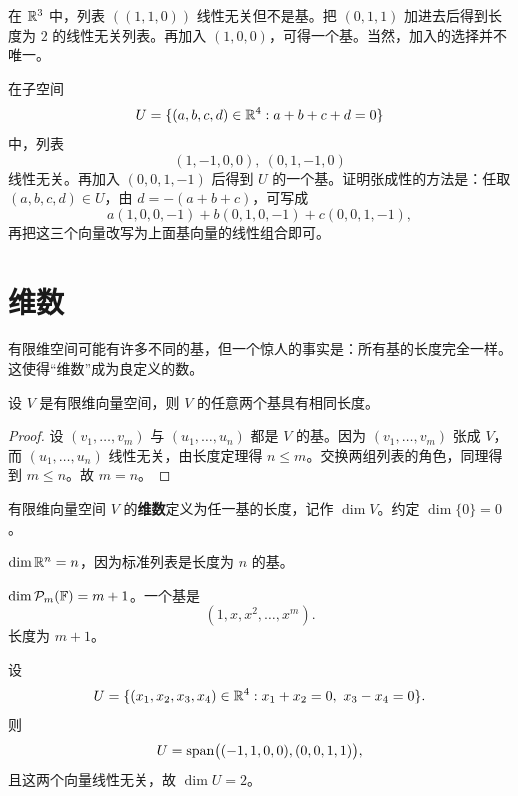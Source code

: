 \begin{example} 在 $\mathbb{R}^3$ 中，列表 $((1,1,0))$ 线性无关但不是基。把 $(0,1,1)$ 加进去后得到长度为 $2$ 的线性无关列表。再加入 $(1,0,0)$，可得一个基。当然，加入的选择并不唯一。
\end{example}

\begin{example} 在子空间
\[ U=\{(a,b,c,d)\in\mathbb{R}^4:a+b+c+d=0\} \]
中，列表
\[ (1,-1,0,0),\ (0,1,-1,0) \]
线性无关。再加入 $(0,0,1,-1)$ 后得到 $U$ 的一个基。证明张成性的方法是：任取 $(a,b,c,d)\in U$，由 $d=-(a+b+c)$，可写成
\[ a(1,0,0,-1)+b(0,1,0,-1)+c(0,0,1,-1), \]
再把这三个向量改写为上面基向量的线性组合即可。
\end{example}

\section{维数}

有限维空间可能有许多不同的基，但一个惊人的事实是：所有基的长度完全一样。这使得“维数”成为良定义的数。

\begin{theorem} 设 $V$ 是有限维向量空间，则 $V$ 的任意两个基具有相同长度。
\end{theorem}

\begin{proof} 设 $(v_1,\dots,v_m)$ 与 $(u_1,\dots,u_n)$ 都是 $V$ 的基。因为 $(v_1,\dots,v_m)$ 张成 $V$，而 $(u_1,\dots,u_n)$ 线性无关，由长度定理得 $n\le m$。交换两组列表的角色，同理得到 $m\le n$。故 $m=n$。
\end{proof}

\begin{definition} 有限维向量空间 $V$ 的\textbf{维数}定义为任一基的长度，记作 $\dim V$。约定 $\dim\{0\}=0$。
\end{definition}

\begin{example} $\dim\mathbb{R}^n=n$，因为标准列表是长度为 $n$ 的基。
\end{example}

\begin{example} $\dim\mathcal{P}_m(\mathbb{F})=m+1$。一个基是
\[ (1,x,x^2,\dots,x^m). \]
长度为 $m+1$。
\end{example}

\begin{example} 设
\[ U=\{(x_1,x_2,x_3,x_4)\in\R^4:x_1+x_2=0,\ x_3-x_4=0\}. \]
则
\[ U=\operatorname{span}\bigl((-1,1,0,0),(0,0,1,1)\bigr), \]
且这两个向量线性无关，故 $\dim U=2$。
\end{example}

